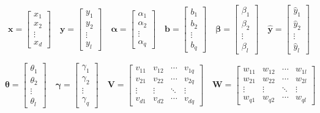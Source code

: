 \documentclass{ctexart}
\begin{document}
	\begin{equation}
		\bm{x}=\begin{bmatrix}
			x_1\\x_2\\\vdots\\x_d
		\end{bmatrix}\quad
		\bm{y}=\begin{bmatrix}
			y_1\\y_2\\\vdots\\y_l
		\end{bmatrix}\quad
		\bm{\alpha}=\begin{bmatrix}
			\alpha_1\\\alpha_2\\\vdots\\\alpha_q
		\end{bmatrix}\quad
		\bm{b}=\begin{bmatrix}
			b_1\\b_2\\\vdots\\b_q
		\end{bmatrix}\quad
		\bm{\beta}=\begin{bmatrix}
			\beta_1\\\beta_2\\\vdots\\\beta_l
		\end{bmatrix}\quad
		\hat{\bm{y}}=\begin{bmatrix}
			\hat{y}_1\\\hat{y}_2\\\vdots\\\hat{y}_l
		\end{bmatrix}
	\end{equation}
	
	\begin{equation}
		\bm{\theta}=\begin{bmatrix}
			\theta_1\\\theta_2\\\vdots\\\theta_l
		\end{bmatrix}\quad
		\bm{\gamma}=\begin{bmatrix}
			\gamma_1\\\gamma_2\\\vdots\\\gamma_q
		\end{bmatrix}\quad
		\bm{V}=\begin{bmatrix}  
			v_{11} & v_{12} & \cdots & v_{1q} \\  
			v_{21} & v_{22} & \cdots & v_{2q} \\  
			\vdots & \vdots & \ddots & \vdots \\  
			v_{d1} & v_{d2} & \cdots & v_{dq}  
		\end{bmatrix}\quad
		\bm{W}=\begin{bmatrix}  
			w_{11} & w_{12} & \cdots & w_{1l} \\  
			w_{21} & w_{22} & \cdots & w_{2l} \\  
			\vdots & \vdots & \ddots & \vdots \\  
			w_{q1} & w_{q2} & \cdots & w_{ql}
		\end{bmatrix}
	\end{equation}
	
\end{document}
